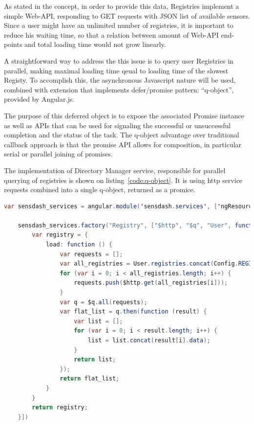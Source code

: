 As stated in the concept, in order to provide this data, Registries implement a simple Web-API, responding to GET requests with JSON list of available sensors. Since a user might have an unlimited number of registries, it is important to reduce his waiting time, so that a relation between amount of Web-API end-points and total loading time would not grow linearly.

A straightforward way to address the this issue is to query user Registries in parallel, making maximal loading time qeual to loading time of the slowest Registy. To accomplish this, the asynchronous Javascript nature will be used, combined with extension that implements defer/promise pattern: ``q-object'', provided by Angular.js.

The purpose of this deferred object is to expose the associated Promise instance as well as APIs that can be used for signaling the successful or unsuccessful completion and the status of the task. The q-object advantage over traditional callback approach is that the promise API allows for composition, in particular serial or parallel joining of promises.

The implementation of Directory Manager service, responsible for parallel querying of registries is shown on listing~\ref{code:q-object}. It is using http service requests combined into a single q-object, returned as a promice.  

    \begin{lstlisting}[language=java,label=code:q-object,caption=Parallel requests to Registies combinied in q-object]
	var sensdash_services = angular.module('sensdash.services', ['ngResource']);

	sensdash_services.factory("Registry", ["$http", "$q", "User", function ($http, $q, User) {
	    var registry = {
	        load: function () {
	            var requests = [];
	            var all_registries = User.registries.concat(Config.REGISTRIES);
	            for (var i = 0; i < all_registries.length; i++) {
	                requests.push($http.get(all_registries[i]));
	            }
	            var q = $q.all(requests);
	            var flat_list = q.then(function (result) {
	                var list = [];
	                for (var i = 0; i < result.length; i++) {
	                    list = list.concat(result[i].data);
	                }
	                return list;
	            });
	            return flat_list;
	        }
	    }
	    return registry;
	}])
    \end{lstlisting}

